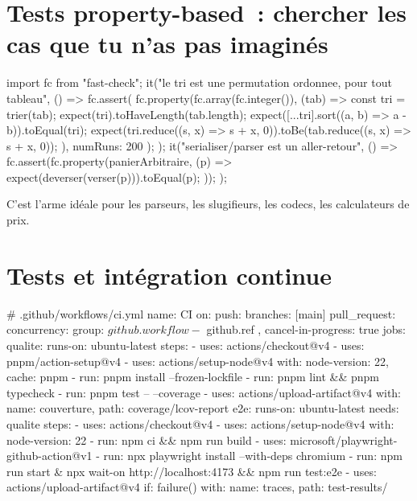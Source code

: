 \documentclass[12pt,a4paper,twoside,openright]{book}
\begin{document}
\section{Tests property-based~: chercher les cas que tu n'as pas imagin\'es}

\begin{codejs}
import fc from "fast-check";
it("le tri est une permutation ordonnee, pour tout tableau", () => {
  fc.assert(
    fc.property(fc.array(fc.integer()), (tab) => {
      const tri = trier(tab);
      expect(tri).toHaveLength(tab.length);
      expect([...tri].sort((a, b) => a - b)).toEqual(tri);
      expect(tri.reduce((s, x) => s + x, 0)).toBe(tab.reduce((s, x) => s + x, 0));
    }),
    { numRuns: 200 }
  );
});
it("serialiser/parser est un aller-retour", () => {
  fc.assert(fc.property(panierArbitraire, (p) => {
    expect(deverser(verser(p))).toEqual(p);
  }));
});
\end{codejs}

C'est l'arme id\'eale pour les parseurs, les slugifieurs, les codecs, les calculateurs de prix.

\section{Tests et int\'egration continue}

\begin{codeyml}
# .github/workflows/ci.yml
name: CI
on:
  push: { branches: [main] }
  pull_request:
concurrency: { group: ${{ github.workflow }}-${{ github.ref }}, cancel-in-progress: true }
jobs:
  qualite:
    runs-on: ubuntu-latest
    steps:
      - uses: actions/checkout@v4
      - uses: pnpm/action-setup@v4
      - uses: actions/setup-node@v4
        with: { node-version: 22, cache: pnpm }
      - run: pnpm install --frozen-lockfile
      - run: pnpm lint && pnpm typecheck
      - run: pnpm test -- --coverage
      - uses: actions/upload-artifact@v4
        with: { name: couverture, path: coverage/lcov-report }
  e2e:
    runs-on: ubuntu-latest
    needs: qualite
    steps:
      - uses: actions/checkout@v4
      - uses: actions/setup-node@v4
        with: { node-version: 22 }
      - run: npm ci && npm run build
      - uses: microsoft/playwright-github-action@v1
      - run: npx playwright install --with-deps chromium
      - run: npm run start & npx wait-on http://localhost:4173 && npm run test:e2e
      - uses: actions/upload-artifact@v4
        if: failure()
        with: { name: traces, path: test-results/ }
\end{codeyml}
\end{document}
